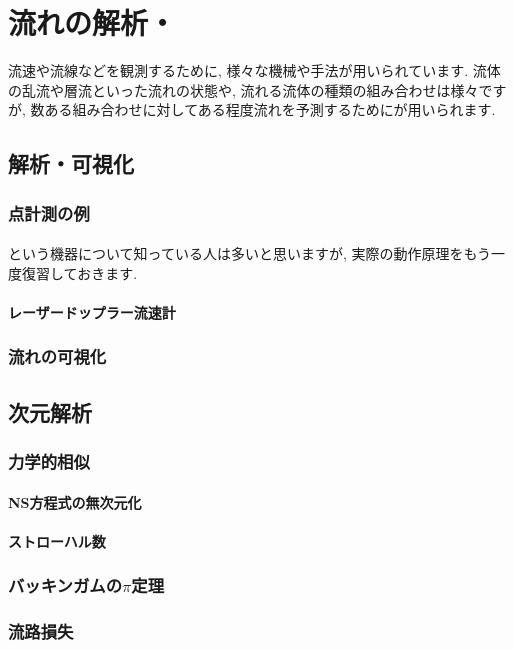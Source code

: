 \documentclass[uplatex,12pt]{jsbook}
\newcommand{\strong}[1]{{\textbf{\color{violet} #1}}}
\begin{document}
	\chapter{流れの解析・\DimAnalysis}
	流速や流線などを観測するために, 様々な機械や手法が用いられています. 流体の乱流や層流といった流れの状態や, 流れる流体の種類の組み合わせは様々ですが, 数ある組み合わせに対してある程度流れを予測するために\DimAnalysis が用いられます. 
	\section{解析・可視化}
	\subsection{点計測の例}
	\subsubsection{\PitotTube}
	\strong{\PitotTube}という機器について知っている人は多いと思いますが, 実際の動作原理をもう一度復習しておきます.
	\subsubsection{レーザードップラー流速計}
	\subsection{流れの可視化}
	\section{次元解析}
	\subsection{力学的相似}
	\subsubsection{NS方程式の無次元化}
	\subsubsection{ストローハル数}
	\subsection{バッキンガムの$\pi$定理}
	\subsection{流路損失}
\end{document}
